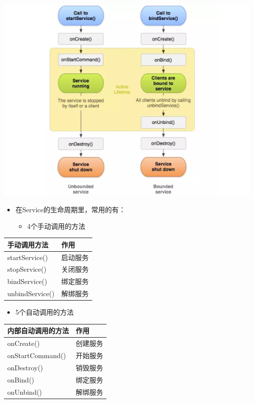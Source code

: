 \documentclass[9pt, b5paper]{article}
\begin{document}
\includegraphics[width=.9\linewidth]{./pic/serviceCallbacks.png}
\begin{itemize}
\item 在Service的生命周期里，常用的有：
\begin{itemize}
\item 4个手动调用的方法
\end{itemize}
\end{itemize}
\begin{center}
\begin{tabular}{ll}
\hline
手动调用方法 & 作用\\
\hline
startService() & 启动服务\\
stopService() & 关闭服务\\
bindService() & 绑定服务\\
unbindService() & 解绑服务\\
\hline
\end{tabular}
\end{center}
\begin{itemize}
\item 5个自动调用的方法
\end{itemize}
\begin{center}
\begin{tabular}{ll}
\hline
内部自动调用的方法 & 作用\\
\hline
onCreate() & 创建服务\\
onStartCommand() & 开始服务\\
onDestroy() & 销毁服务\\
onBind() & 绑定服务\\
onUnbind() & 解绑服务\\
\hline
\end{tabular}
\end{center}
\end{document}
